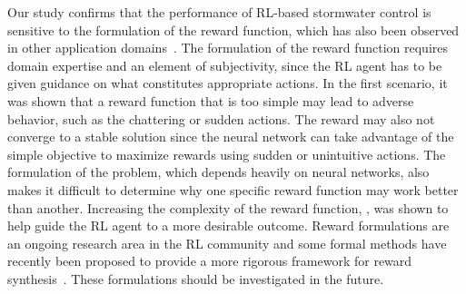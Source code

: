Our study confirms that the performance of RL-based stormwater control is sensitive to the formulation of the reward function, which has also been observed in other application domains~\cite{ng1999policy}.
The formulation of the reward function requires domain expertise and an element of subjectivity, since the RL agent has to be given guidance on what constitutes appropriate actions.
In the first scenario, it was shown that a reward function that is too simple may lead to adverse behavior, such as the chattering or sudden actions.
The reward may also not converge to a stable solution since the neural network can take advantage of the simple objective to maximize rewards using sudden or unintuitive actions.
The formulation of the problem, which depends heavily on neural networks, also makes it difficult to determine why one specific reward function may work better than another.
Increasing the complexity of the reward function, , was shown to help guide the RL agent to a more desirable outcome. 
Reward formulations are an ongoing research area in the RL community and some formal methods have recently been proposed to provide a more rigorous framework for reward synthesis~\cite{fu2017learning}. These formulations should be investigated in the future.


